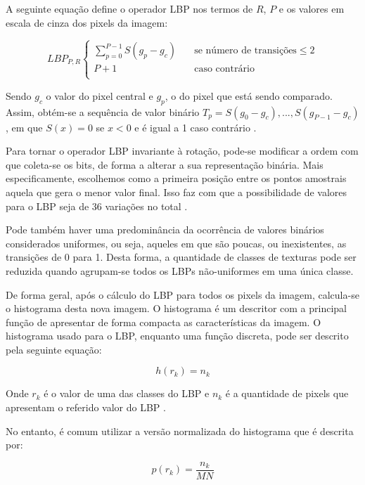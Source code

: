 A seguinte equação define o operador LBP nos termos de $R$, $P$ e os valores em escala de cinza dos pixels da imagem:

\begin{equation}
\label{eq:eqLBP}
 LBP_{P,R}
   \begin{cases}
    \displaystyle\sum_{p=0}^{P-1}S(g_p - g_c)  & \quad \text{se número de transições} \leq 2 \\
    P+1  & \quad \text{caso contrário } \\
   \end{cases}
\end{equation}

 Sendo $g_c$ o valor do pixel central e $g_p$, o do pixel que está sendo comparado. Assim, obtém-se a sequência de valor binário $T_p={S(g_0 - g_c), ...,S(g_{P-1} - g_c)}$, em que $S(x) = 0$ se $x < 0$ e é igual a 1 caso contrário .

Para tornar o operador LBP invariante à rotação, pode-se modificar a ordem com que coleta-se os bits, de forma a alterar a sua representação binária. Mais especificamente, escolhemos como a primeira posição entre os pontos amostrais aquela que gera o menor valor final. Isso faz com que a possibilidade de valores para o LBP seja de 36 variações no total .

Pode também haver uma predominância da ocorrência de valores binários considerados uniformes, ou seja, aqueles em que são poucas, ou inexistentes, as transições de 0 para 1. Desta forma, a quantidade de classes de texturas pode ser reduzida quando agrupam-se todos os LBPs não-uniformes em uma única classe.

De forma geral, após o cálculo do LBP para todos os pixels da imagem, calcula-se o histograma desta nova imagem. O histograma é um descritor com a principal função de apresentar de forma compacta as características da imagem. O histograma usado para o LBP, enquanto uma função discreta, pode ser descrito pela seguinte equação:

\begin{equation}
\label{eq:eqHist}
  h(r_k)=n_k
\end{equation}

Onde $r_k$ é o valor de uma das classes do LBP e $n_k$ é a quantidade de pixels que apresentam o referido valor do LBP .

No entanto, é comum utilizar a versão normalizada do histograma que é descrita por:

\begin{equation}
\label{eq:eqHistNorm}
  p(r_k)=\frac{n_k}{MN}
\end{equation}

